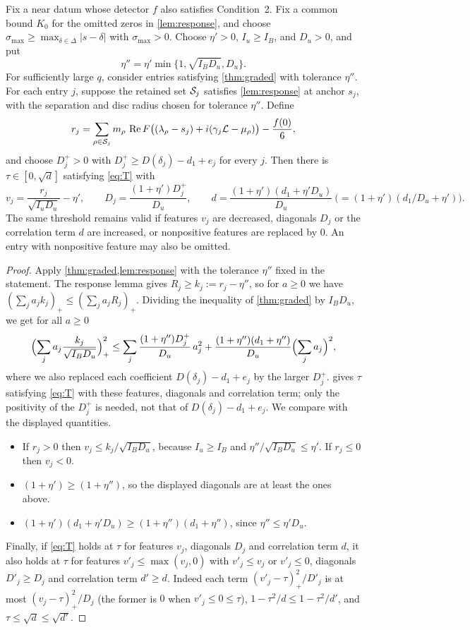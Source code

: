 \begin{corollary}\label{cor:zeroform}
Fix a near datum whose detector $f$ also satisfies Condition~2. Fix a common bound
$K_0$ for the omitted zeros in \cref{lem:response}, and choose
$\sigma_{\max}\ge\max_{\delta\in\Delta}|s-\delta|$ with $\sigma_{\max}>0$.
Choose $\eta'>0$, $I_u\ge I_B$, and $D_u>0$, and put
\[
  \eta''=\eta'\min\{1,\sqrt{I_BD_u},D_u\}.
\]
For sufficiently large $q$, consider entries satisfying \cref{thm:graded} with tolerance
$\eta''$. For each entry $j$, suppose the retained set $\mathcal{S}_j$ satisfies
\cref{lem:response} at anchor $s_j$, with the separation and disc radius chosen for
tolerance $\eta''$. Define
\[
  r_j=\sum_{\rho\in\mathcal{S}_j}m_\rho\,\operatorname{Re} F\bigl((\lambda_\rho-s_j)+i(\gamma_j\mathcal{L}-\mu_\rho)\bigr)-\frac{f(0)}6 ,
\]
and choose $D_j^+>0$ with $D_j^+\ge D(\delta_j)-d_1+e_j$ for every $j$.
Then there is $\tau\in[0,\sqrt d]$ satisfying \eqref{eq:T} with
\[
  v_j=\frac{r_j}{\sqrt{I_uD_u}}-\eta',\qquad D_j=\frac{(1+\eta')D_j^+}{D_u},\qquad
  d=\frac{(1+\eta')(d_1+\eta'D_u)}{D_u}\ \bigl(=(1+\eta')(d_1/D_u+\eta')\bigr).
\]
The same threshold remains valid if features $v_j$ are decreased, diagonals $D_j$ or
the correlation term $d$ are increased, or nonpositive features are replaced by $0$.
An entry with nonpositive feature may also be omitted.
\end{corollary}

\begin{proof}
Apply \cref{thm:graded,lem:response} with the tolerance $\eta''$ fixed in the statement.
The response lemma gives $R_j\ge k_j:=r_j-\eta''$, so for $a\ge0$
we have $(\sum_ja_jk_j)_+\le(\sum_ja_jR_j)_+$. Dividing the inequality of \cref{thm:graded} by
$I_BD_u$, we get for all $a\ge0$
\[
  \Bigl(\sum_ja_j\frac{k_j}{\sqrt{I_BD_u}}\Bigr)_+^2\le
  \sum_j\frac{(1+\eta'')D_j^+}{D_u}\,a_j^2+\frac{(1+\eta'')(d_1+\eta'')}{D_u}
  \Bigl(\sum_ja_j\Bigr)^2 ,
\]
where we also replaced each coefficient $D(\delta_j)-d_1+e_j$ by the larger $D_j^+$.
 gives $\tau$ satisfying \eqref{eq:T} with these features, diagonals and
correlation term; only the positivity of the $D_j^+$ is needed, not that of $D(\delta_j)-d_1+e_j$. We compare with the displayed quantities.
\begin{itemize}
  \item If $r_j>0$ then $v_j\le k_j/\sqrt{I_BD_u}$, because $I_u\ge I_B$ and
    $\eta''/\sqrt{I_BD_u}\le\eta'$. If $r_j\le0$ then $v_j<0$.
  \item $(1+\eta')\ge(1+\eta'')$, so the displayed diagonals are at least the ones above.
  \item $(1+\eta')(d_1+\eta'D_u)\ge(1+\eta'')(d_1+\eta'')$, since $\eta''\le\eta'D_u$.
\end{itemize}
Finally, if \eqref{eq:T} holds at $\tau$ for features $v_j$, diagonals $D_j$ and correlation term $d$, it
also holds at $\tau$ for features $v'_j\le\max(v_j,0)$ with $v'_j\le v_j$ or $v'_j\le0$, diagonals
$D'_j\ge D_j$ and correlation term $d'\ge d$. Indeed each term $(v'_j-\tau)_+^2/D'_j$ is at most
$(v_j-\tau)_+^2/D_j$ (the former is $0$ when $v'_j\le0\le\tau$), $1-\tau^2/d\le1-\tau^2/d'$, and
$\tau\le\sqrt d\le\sqrt{d'}$.
\end{proof}
